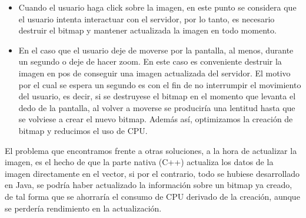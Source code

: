 \begin{itemize}
\begin{itemize}
\item Cuando el usuario haga click sobre la imagen, en este punto se     considera que el usuario intenta interactuar con el servidor, por lo     tanto, es necesario destruir el bitmap y mantener actualizada la imagen en todo momento.
\item En el caso que el usuario deje de moverse por la pantalla, al menos, durante un segundo o deje de hacer zoom. En este caso es     conveniente destruir la imagen en pos de conseguir una imagen actualizada del servidor. El motivo por el cual se espera un segundo es con el fin de no interrumpir el movimiento del usuario, es decir, si se destruyese el bitmap en el momento que levanta el dedo de la pantalla, al volver a moverse se produciría una lentitud hasta que se volviese a crear el nuevo bitmap. Además así, optimizamos la creación de bitmap y reducimos el uso de CPU.
\end{itemize}

\end{itemize}

El problema que encontramos frente a otras soluciones, a la hora de actualizar la imagen, es el hecho de que la parte nativa (C++) actualiza los datos de la imagen directamente en el vector, si por el contrario, todo se hubiese desarrollado en Java, se podría haber actualizado la información sobre un bitmap ya creado, de tal forma que se ahorraría el consumo de CPU derivado de la creación, aunque se perdería rendimiento en la actualización.\\

